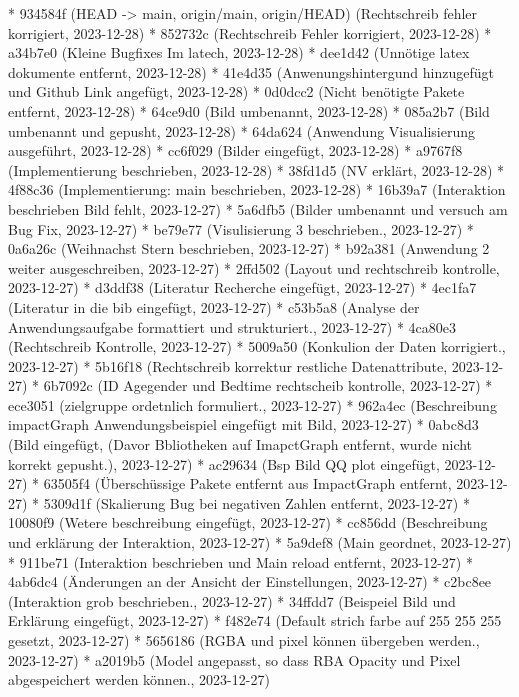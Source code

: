 \documentclass[usegeometry=true]{scrartcl}
\begin{document}
* 934584f (HEAD -> main, origin/main, origin/HEAD) (Rechtschreib fehler korrigiert, 2023-12-28)
* 852732c (Rechtschreib Fehler korrigiert, 2023-12-28)
* a34b7e0 (Kleine Bugfixes Im latech, 2023-12-28)
* dee1d42 (Unnötige latex dokumente entfernt, 2023-12-28)
* 41e4d35 (Anwenungshintergund hinzugefügt und Github Link angefügt, 2023-12-28)
* 0d0dcc2 (Nicht benötigte Pakete entfernt, 2023-12-28)
* 64ce9d0 (Bild umbenannt, 2023-12-28)
* 085a2b7 (Bild umbenannt und gepusht, 2023-12-28)
* 64da624 (Anwendung Visualisierung ausgeführt, 2023-12-28)
* cc6f029 (Bilder eingefügt, 2023-12-28)
* a9767f8 (Implementierung beschrieben, 2023-12-28)
* 38fd1d5 (NV erklärt, 2023-12-28)
* 4f88c36 (Implementierung: main beschrieben, 2023-12-28)
* 16b39a7 (Interaktion beschrieben Bild fehlt, 2023-12-27)
* 5a6dfb5 (Bilder umbenannt und versuch am Bug Fix, 2023-12-27)
* be79e77 (Visulisierung 3 beschrieben., 2023-12-27)
* 0a6a26c (Weihnachst Stern beschrieben, 2023-12-27)
* b92a381 (Anwendung 2 weiter ausgeschreiben, 2023-12-27)
* 2ffd502 (Layout und rechtschreib kontrolle, 2023-12-27)
* d3ddf38 (Literatur Recherche eingefügt, 2023-12-27)
* 4ec1fa7 (Literatur in die bib eingefügt, 2023-12-27)
* c53b5a8 (Analyse der Anwendungsaufgabe formattiert und strukturiert., 2023-12-27)
* 4ca80e3 (Rechtschreib Kontrolle, 2023-12-27)
* 5009a50 (Konkulion der Daten korrigiert., 2023-12-27)
* 5b16f18 (Rechtschreib korrektur restliche Datenattribute, 2023-12-27)
* 6b7092c (ID Agegender und Bedtime rechtscheib kontrolle, 2023-12-27)
* ece3051 (zielgruppe ordetnlich formuliert., 2023-12-27)
* 962a4ec (Beschreibung impactGraph Anwendungsbeispiel eingefügt mit Bild, 2023-12-27)
* 0abc8d3 (Bild eingefügt, (Davor Bbliotheken auf ImapctGraph entfernt, wurde nicht korrekt gepusht.), 2023-12-27)
* ac29634 (Bsp Bild QQ plot eingefügt, 2023-12-27)
* 63505f4 (Überschüssige Pakete entfernt aus ImpactGraph entfernt, 2023-12-27)
* 5309d1f (Skalierung Bug bei negativen Zahlen entfernt, 2023-12-27)
* 10080f9 (Wetere beschreibung eingefügt, 2023-12-27)
* cc856dd (Beschreibung und erklärung der Interaktion, 2023-12-27)
* 5a9def8 (Main geordnet, 2023-12-27)
* 911be71 (Interaktion beschrieben und Main reload entfernt, 2023-12-27)
* 4ab6dc4 (Änderungen an der Ansicht der Einstellungen, 2023-12-27)
* c2bc8ee (Interaktion grob beschrieben., 2023-12-27)
* 34ffdd7 (Beispeiel Bild und Erklärung eingefügt, 2023-12-27)
* f482e74 (Default strich farbe auf 255 255 255 gesetzt, 2023-12-27)
* 5656186 (RGBA und pixel können übergeben werden., 2023-12-27)
* a2019b5 (Model angepasst, so dass RBA Opacity und Pixel abgespeichert werden können., 2023-12-27)
\end{document}
